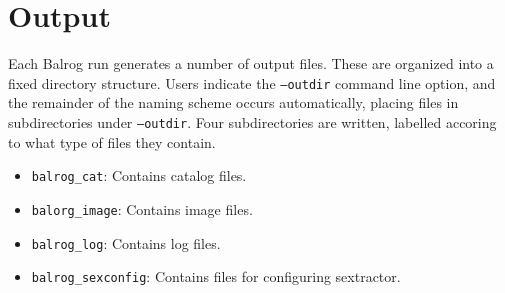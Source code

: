 \documentclass[12pt]{article}
\newcommand{\balrog}{Balrog}
\newcommand{\opt}[1]{\texttt{--#1}}
\begin{document}
\section{Output}
Each \balrog{} run generates a number of output files. 
These are organized into a fixed directory structure.
Users indicate the \opt{outdir} command line option, and
the remainder of the naming scheme occurs automatically,
placing files in subdirectories under \opt{outdir}.
Four subdirectories are written, labelled accoring to what
type of files they contain. 

\begin{itemize}
	\item \texttt{balrog\_cat}: Contains catalog files.
	\item \texttt{balorg\_image}: Contains image files.
	\item \texttt{balrog\_log}: Contains log files.
	\item \texttt{balrog\_sexconfig}: Contains files for configuring sextractor.
\end{itemize}
\end{document}
